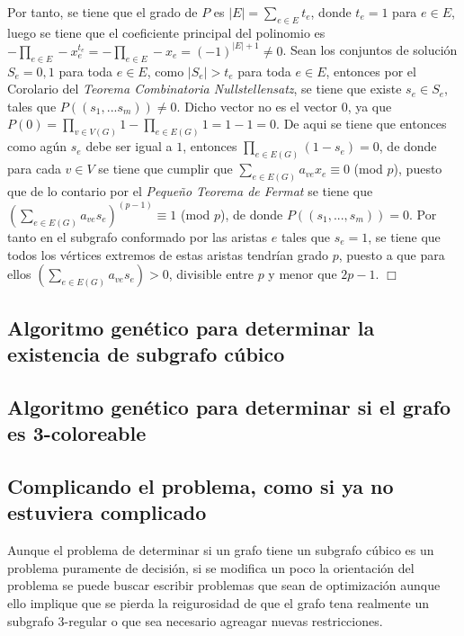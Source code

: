 \documentclass{article}
\begin{document}
Por tanto, se tiene que el grado de $P$ es $|E| = \sum_{e \in E} t_e$, donde $t_e = 1$ para $e \in E$, luego se tiene que el 
coeficiente principal del polinomio es $- \prod_{e \in E}  - x_e^{t_e} = - \prod_{e \in E} - x_e = (-1)^{|E| + 1} \neq 0$. Sean los 
conjuntos de soluci\'on $S_e = {0,1}$ para toda $e \in E$, como $|S_e| > t_e$ para toda $e \in E$, entonces por el Corolario del \textit{Teorema Combinatoria Nullstellensatz}, se tiene 
que existe $s_e \in S_e$, tales que $P((s_1,...s_m))  \neq 0$. Dicho vector no es el vector $0$, ya que $P(0) = \prod_{v \in V(G)}  1 - \prod_{e \in E(G)} 1 = 1 - 1 = 0$. De aqui se tiene que entonces 
como ag\'un $s_e$ debe ser igual a $1$, entonces $\prod_{e \in E(G)} (1 - s_e) = 0$, de donde para cada $v \in V$ se tiene que cumplir que 
$\sum_{e \in E(G)} a_{ve} x_e \equiv 0$ (mod $p$), puesto que de lo contario por el \textit{Peque\~no Teorema de Fermat} se tiene que $(\sum_{e \in E(G)} a_{ve} s_e)^(p-1) \equiv 1$ (mod $p$), de donde 
$P((s_1,...,s_m)) = 0 $. Por tanto en el subgrafo conformado por las aristas $e$ tales que $s_e = 1$, se tiene que todos los v\'ertices extremos de estas aristas tendr\'ian grado $p$, puesto a que para ellos
$(\sum_{e \in E(G)} a_{ve} s_e) > 0$, divisible entre $p$ y menor que $2p-1$. $\Box $


\subsection*{Algoritmo gen\'etico para determinar la existencia de subgrafo c\'ubico}

\subsection*{Algoritmo gen\'etico para determinar si el grafo es 3-coloreable}

\subsection*{Complicando el problema, como si ya no estuviera complicado}
Aunque el problema de determinar si un grafo tiene un subgrafo c\'ubico es un problema puramente de decisi\'on, 
si se modifica un poco la orientaci\'on del problema se puede buscar escribir problemas que sean de optimizaci\'on 
aunque ello implique que se pierda la reigurosidad de que el grafo tena realmente un subgrafo $3$-regular o que 
sea necesario agreagar nuevas restricciones.\\
\end{document}
